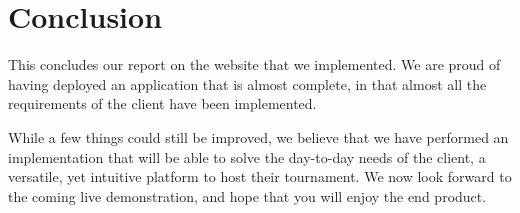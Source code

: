 \section{Conclusion}
\label{sec:Conclusion}

This concludes our report on the website that we implemented. 
We are proud of having deployed an application that is almost complete, 
in that almost all the requirements of the client have been implemented. \newline

While a few things could still be improved, we believe that we have performed
an implementation that will be able to solve the day-to-day needs of the
client, a versatile, yet intuitive platform to host their
tournament. We now look forward to the coming live demonstration, and hope that
you will enjoy the end product.